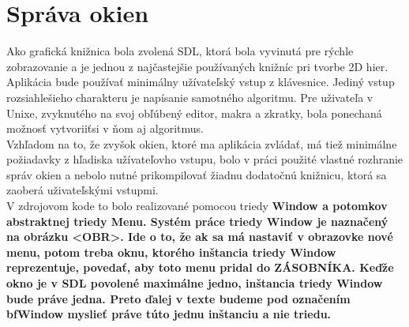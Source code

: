 \section{Správa okien}
Ako grafická knižnica bola zvolená SDL\cite{sdl}, ktorá bola vyvinutá pre rýchle zobrazovanie a je jednou z najčastejšie používaných knižníc pri tvorbe 2D hier. Aplikácia bude používať minimálny užívateľský vstup z klávesnice. Jediný vstup rozsiahlešieho charakteru je napísanie samotného algoritmu. Pre uživateľa v Unixe, zvyknutého na svoj obľúbený editor, makra a zkratky, bola ponechaná možnosť vytvoriiťsi v ňom aj  algoritmus. \\ %
Vzhľadom na to, že zvyšok okien, ktoré ma aplikácia zvládať, má tiež minimálne požiadavky z hľadiska užívateľovho vstupu, bolo v práci použité vlastné rozhranie správ okien a nebolo nutné prikompilovať žiadnu dodatočnú knižnicu, ktorá sa zaoberá uživateľskými vstupmi.\\
V zdrojovom kode to bolo realizované pomocou triedy \bf{Window} a potomkov abstraktnej triedy {\bf Menu}. Systém práce triedy  {\bf Window} je naznačený na obrázku <OBR>. Ide o to, že ak sa má nastaviť v obrazovke nové menu, potom treba oknu, ktorého inštancia triedy Window reprezentuje, povedať, aby toto menu pridal do ZÁSOBNÍKA. Keďže okno je v SDL povolené maximálne jedno, inštancia triedy {\bf Window} bude práve jedna. Preto ďalej v texte budeme pod označením bf{Window} myslieť práve túto jednu inštanciu a nie triedu.\\

